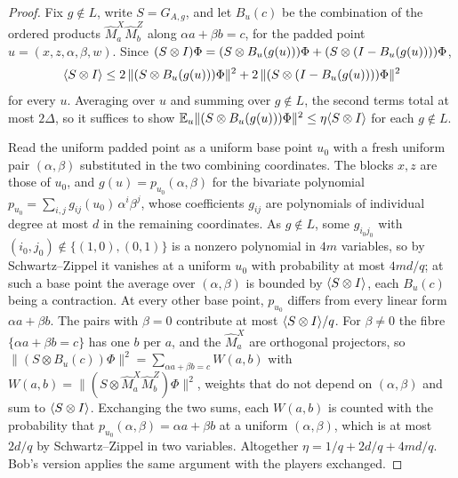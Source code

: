 \begin{proof}
\leanok
Fix $g \notin L$, write $S = G_{A,g}$, and let $B_u(c)$ be the combination of the ordered
products $\widehat M^X_a \widehat M^Z_b$ along $\alpha a + \beta b = c$, for the padded point
$u = (x, z, \alpha, \beta, w)$. Since
$(S \otimes I)\Phi = (S \otimes B_u(g(u)))\Phi + (S \otimes (I - B_u(g(u))))\Phi$,
\[
  \langle S \otimes I \rangle
    \leq 2\,\|(S \otimes B_u(g(u)))\Phi\|^2 + 2\,\|(S \otimes (I - B_u(g(u))))\Phi\|^2
\]
for every $u$. Averaging over $u$ and summing over $g \notin L$, the second terms total at most
$2\Delta$, so it suffices to show $\mathbb E_u \|(S \otimes B_u(g(u)))\Phi\|^2 \leq \eta
\langle S \otimes I \rangle$ for each $g \notin L$.

Read the uniform padded point as a uniform base point $u_0$ with a fresh uniform pair
$(\alpha, \beta)$ substituted in the two combining coordinates. The blocks $x, z$ are those of
$u_0$, and $g(u) = p_{u_0}(\alpha, \beta)$ for the bivariate polynomial
$p_{u_0} = \sum_{i,j} g_{ij}(u_0)\,\alpha^i \beta^j$, whose coefficients $g_{ij}$ are polynomials
of individual degree at most $d$ in the remaining coordinates. As $g \notin L$, some
$g_{i_0 j_0}$ with $(i_0, j_0) \notin \{(1, 0), (0, 1)\}$ is a nonzero polynomial in $4m$
variables, so by Schwartz--Zippel it vanishes at a uniform $u_0$ with probability at most
$4md/q$; at such a base point the average over $(\alpha, \beta)$ is bounded by
$\langle S \otimes I \rangle$, each $B_u(c)$ being a contraction. At every other base point,
$p_{u_0}$ differs from every linear form $\alpha a + \beta b$. The pairs with $\beta = 0$
contribute at most $\langle S \otimes I \rangle / q$. For $\beta \neq 0$ the fibre
$\{\alpha a + \beta b = c\}$ has one $b$ per $a$, and the $\widehat M^X_a$ are orthogonal
projectors, so
$\|(S \otimes B_u(c))\Phi\|^2 = \sum_{\alpha a + \beta b = c} W(a, b)$ with
$W(a, b) = \|(S \otimes \widehat M^X_a \widehat M^Z_b)\Phi\|^2$, weights that do not depend on
$(\alpha, \beta)$ and sum to $\langle S \otimes I \rangle$. Exchanging the two sums, each
$W(a, b)$ is counted with the probability that $p_{u_0}(\alpha, \beta) = \alpha a + \beta b$ at a
uniform $(\alpha, \beta)$, which is at most $2d/q$ by Schwartz--Zippel in two variables.
Altogether $\eta = 1/q + 2d/q + 4md/q$. Bob's version applies the same argument with the players
exchanged.
\end{proof}

